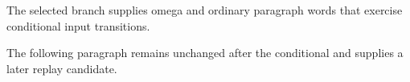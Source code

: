 
\hsize=220pt \vsize=240pt
\iffalse
The selected branch supplies alpha and ordinary paragraph words that exercise conditional input transitions.
\else
The selected branch supplies omega and ordinary paragraph words that exercise conditional input transitions.
\fi

The following paragraph remains unchanged after the conditional and supplies a later replay candidate.
\bye

